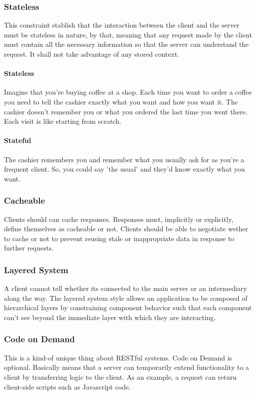 \documentclass[a4paper]{article}
\begin{document}
    \subsubsection{Stateless} This constraint stablish that the interaction between the client and the server must be stateless in nature, by that, meaning that any request made by the client must contain all the necessary information so that the server can understand the request. It shall not take advantage of any stored context. 
    
    \paragraph{Stateless} Imagine that you're buying coffee at a shop. Each time you want to order a coffee you need to tell the cashier exactly what you want and how you want it. The cashier doesn't remember you or what you ordered the last time you went there. Each visit is like starting from scratch. 

    \paragraph{Stateful} The cashier remembers you and remember what you usually ask for as you're a frequent client. So, you could say 'the usual' and they'd know exactly what you want.

    \subsubsection{Cacheable} Clients should can cache responses. Responses must, implicitly or explicitly, define themselves as cacheable or not. Clients should be able to negotiate wether to cache or not to prevent reusing stale or inappropriate data in response to further requests.


    \subsubsection{Layered System} A client cannot tell whether its connected to the main server or an intermediary along the way. The layered system style allows an application to be composed of hierarchical layers by constraining component behavior such that each component can't see beyond the immediate layer with which they are interacting.

    \subsubsection{Code on Demand} This is a kind-of unique thing about RESTful systems. Code on Demand is optional. Basically means that a server can temporarily extend functionality to a client by transferring logic to the client. As an example, a request can return client-side scripts such as Javascript code.
\end{document}
